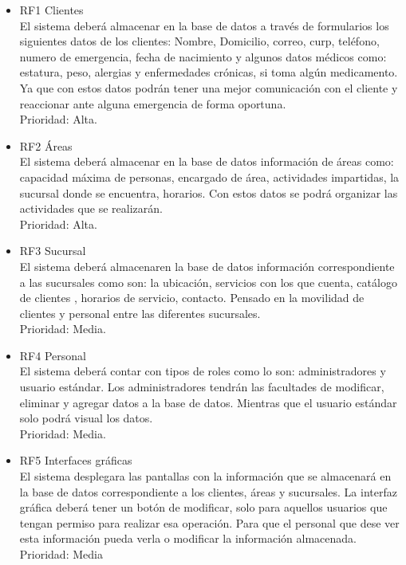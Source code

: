 \documentclass[12pt,letterpaper]{article}
\begin{document}
\begin{itemize}
	\item RF1 Clientes
	\\ El sistema deberá almacenar en la base de datos a través de formularios los siguientes datos de los clientes: Nombre, Domicilio, correo, curp, teléfono, numero de emergencia, fecha de nacimiento y algunos datos médicos como: estatura, peso, alergias y enfermedades crónicas, si toma algún medicamento. Ya que con estos datos podrán tener una mejor comunicación con el cliente y reaccionar ante alguna emergencia de forma oportuna.
	\\ Prioridad: Alta.
	
	\item RF2 Áreas
	\\ El sistema deberá almacenar en la base de datos información de áreas como: capacidad máxima de personas, encargado de área, actividades impartidas, la sucursal donde se encuentra, horarios. Con estos datos se podrá organizar las actividades que se realizarán.
	\\Prioridad: Alta.
	
	\item RF3 Sucursal
	\\ El sistema deberá almacenaren la base de datos información correspondiente a las sucursales como son: la ubicación, servicios con los que cuenta, catálogo de clientes , horarios de servicio, contacto. Pensado en la movilidad de clientes y personal entre las diferentes sucursales.
	\\Prioridad: Media.
	
	\item RF4 Personal
	\\ El sistema deberá contar con tipos de roles como lo son: administradores y usuario estándar. Los administradores tendrán las facultades de modificar, eliminar y agregar datos a la base de datos. Mientras que el usuario estándar solo podrá visual los datos.
	\\Prioridad: Media. 
	
	\item RF5 Interfaces gráficas
	\\El sistema desplegara las pantallas con la información que se almacenará en la base de datos correspondiente a los clientes, áreas y sucursales. La interfaz gráfica deberá tener un botón de modificar, solo para aquellos usuarios que tengan permiso para realizar esa operación. Para que el personal que dese ver esta información pueda verla o modificar la información almacenada.
	\\Prioridad: Media
	

\end{itemize}
\end{document}
